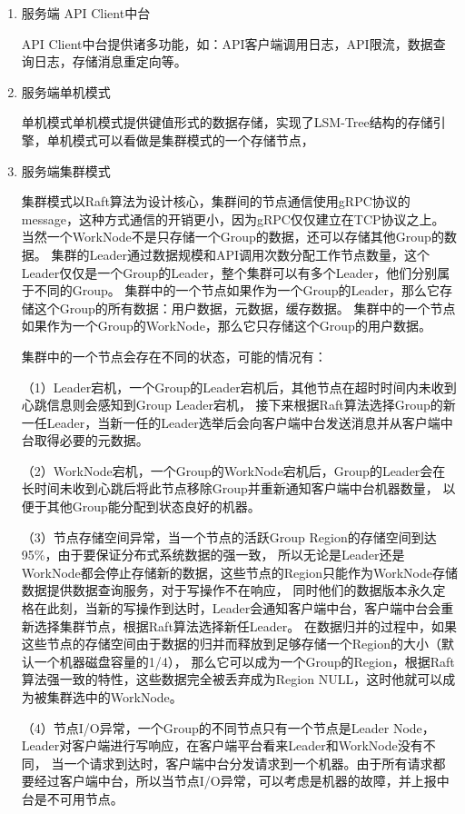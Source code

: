 		\begin{enumerate}
			\item 服务端 API Client中台
			
			API Client中台提供诸多功能，如：API客户端调用日志，API限流，数据查询日志，存储消息重定向等。

			\item 服务端单机模式
			
			单机模式单机模式提供键值形式的数据存储，实现了LSM-Tree结构的存储引擎，单机模式可以看做是集群模式的一个存储节点，
			
			\item 服务端集群模式
			
			集群模式以Raft算法为设计核心，集群间的节点通信使用gRPC协议的message，这种方式通信的开销更小，因为gRPC仅仅建立在TCP协议之上。
			当然一个WorkNode不是只存储一个Group的数据，还可以存储其他Group的数据。
			集群的Leader通过数据规模和API调用次数分配工作节点数量，这个Leader仅仅是一个Group的Leader，整个集群可以有多个Leader，他们分别属于不同的Group。
			集群中的一个节点如果作为一个Group的Leader，那么它存储这个Group的所有数据：用户数据，元数据，缓存数据。
			集群中的一个节点如果作为一个Group的WorkNode，那么它只存储这个Group的用户数据。
			
			集群中的一个节点会存在不同的状态，可能的情况有：
	
			（1）Leader宕机，一个Group的Leader宕机后，其他节点在超时时间内未收到心跳信息则会感知到Group Leader宕机，
			接下来根据Raft算法选择Group的新一任Leader，当新一任的Leader选举后会向客户端中台发送消息并从客户端中台取得必要的元数据。
			
			（2）WorkNode宕机，一个Group的WorkNode宕机后，Group的Leader会在长时间未收到心跳后将此节点移除Group并重新通知客户端中台机器数量，
			以便于其他Group能分配到状态良好的机器。
			
			（3）节点存储空间异常，当一个节点的活跃Group Region的存储空间到达95\%，由于要保证分布式系统数据的强一致，
			所以无论是Leader还是WorkNode都会停止存储新的数据，这些节点的Region只能作为WorkNode存储数据提供数据查询服务，对于写操作不在响应，
			同时他们的数据版本永久定格在此刻，当新的写操作到达时，Leader会通知客户端中台，客户端中台会重新选择集群节点，根据Raft算法选择新任Leader。
			在数据归并的过程中，如果这些节点的存储空间由于数据的归并而释放到足够存储一个Region的大小（默认一个机器磁盘容量的1/4），
			那么它可以成为一个Group的Region，根据Raft算法强一致的特性，这些数据完全被丢弃成为Region NULL，这时他就可以成为被集群选中的WorkNode。
	
			（4）节点I/O异常，一个Group的不同节点只有一个节点是Leader Node，Leader对客户端进行写响应，在客户端平台看来Leader和WorkNode没有不同，
			当一个请求到达时，客户端中台分发请求到一个机器。由于所有请求都要经过客户端中台，所以当节点I/O异常，可以考虑是机器的故障，并上报中台是不可用节点。
	

\end{enumerate}
